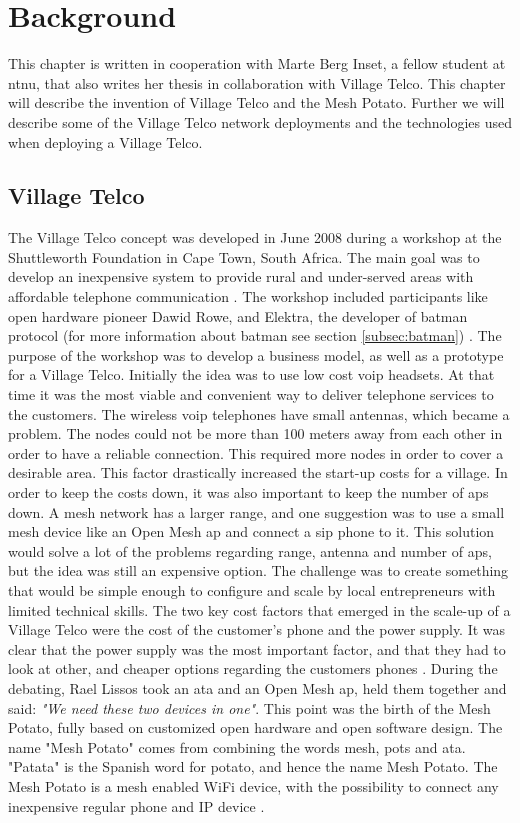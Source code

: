 \chapter{Background}
\label{chp:background} 

This chapter is written in cooperation with Marte Berg Inset, a fellow student at \gls{ntnu}, that also writes her thesis in collaboration with Village Telco. This chapter will describe the invention of Village Telco and the Mesh Potato. Further we will describe some of the Village Telco network deployments and the technologies used when deploying a Village Telco. 

\section{Village Telco}
The Village Telco concept was developed in June 2008 during a workshop at the Shuttleworth Foundation in Cape Town, South Africa. The main goal was to develop an inexpensive system to provide rural and under-served areas with affordable telephone communication \cite{MParticle}. The workshop included participants like open hardware pioneer Dawid Rowe, and Elektra, the developer of \gls{batman} protocol (for more information about \gls{batman} see section \ref{subsec:batman}) \cite{MPworkshop}. The purpose of the workshop was to develop a business model, as well as a prototype for a Village Telco. Initially the idea was to use low cost \gls{voip} headsets. At that time it was the most viable and convenient way to deliver telephone services to the customers. The wireless \gls{voip} telephones have small antennas, which became a problem. The nodes could not be more than 100 meters away from each other in order to have a reliable connection. This required more nodes in order to cover a desirable area. This factor drastically increased the start-up costs for a village. In order to keep the costs down, it was also important to keep the number of \glspl{ap} down. A mesh network has a larger range, and one suggestion was to use a small mesh device like an Open Mesh \gls{ap} and connect a \gls{sip} phone to it. This solution would solve a lot of the problems regarding range, antenna and number of \glspl{ap}, but the idea was still an expensive option. The challenge was to create something that would be simple enough to configure and scale by local entrepreneurs with limited technical skills. The two key cost factors that emerged in the scale-up of a Village Telco were the cost of the customer's phone and the power supply. It was clear that the power supply was the most important factor, and that they had to look at other, and cheaper options regarding the customers phones \cite{MPworkshop}. During the debating, Rael Lissos took an \gls{ata} and an Open Mesh \gls{ap}, held them together and said: \textit{"We need these two devices in one"}. This point was the birth of the Mesh Potato, fully based on customized open hardware and open software design. The name "Mesh Potato" comes from combining the words mesh, \gls{pots} and \gls{ata}. "Patata" is the Spanish word for potato, and hence the name Mesh Potato. The Mesh Potato is a mesh enabled WiFi device, with the possibility to connect any inexpensive regular phone and IP device \cite{MPorigin}.


